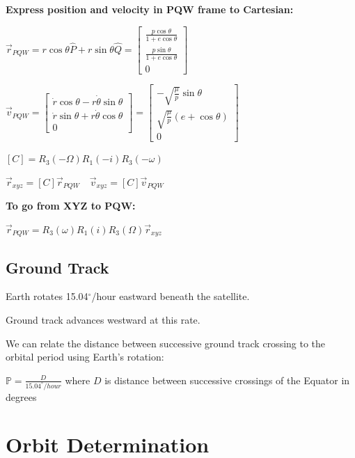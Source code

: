 \documentclass{article}
\begin{document}
\begin{multicols*}{3}
    \textbf{Express position and velocity in PQW frame to Cartesian:}\par 
    $\vec{r}_{PQW} = r\cos{\theta}\hat{P}+r\sin{\theta}\hat{Q}=
    \begin{bmatrix}
        \frac{p\cos{\theta}}{1+e\cos{\theta}}\\
        \frac{p\sin{\theta}}{1+e\cos{\theta}}\\
        0
    \end{bmatrix}
    $\par
    $\vec{v}_{PQW} =
    \begin{bmatrix}
        \dot{r}\cos{\theta}-r\dot{\theta}\sin{\theta}\\
        \dot{r}\sin{\theta}+r\dot{\theta}\cos{\theta}\\
        0
    \end{bmatrix}
    =
    \begin{bmatrix}
        -\sqrt{\frac{\mu}{p}}\sin{\theta}\\
        \sqrt{\frac{\mu}{p}}(e+\cos{\theta})\\
        0
    \end{bmatrix}
    $\par 
    $[C]=R_3(-\Omega)R_1(-i)R_3(-\omega)$\par 
    $\vec{r}_{xyz} = [C]\vec{r}_{PQW} \quad \vec{v}_{xyz}=[C]\vec{v}_{PQW}$\par 
    \textbf{To go from XYZ to PQW:}\par 
    $\vec{r}_{PQW}=R_3(\omega)R_1(i)R_3(\Omega)\vec{r}_{xyz}$

    \subsection*{Ground Track}
    Earth rotates 15.04$^\circ$/hour eastward beneath the satellite.\par 
    Ground track advances westward at this rate.\par 
    We can relate the distance between successive ground track crossing to the
    orbital period using Earth's rotation:\par 
    $\mathbb{P}=\frac{D}{15.04^\circ/hour}$ where $D$ is distance between successive crossings of the Equator in degrees

    \section*{Orbit Determination}

\end{multicols*}
\end{document}
